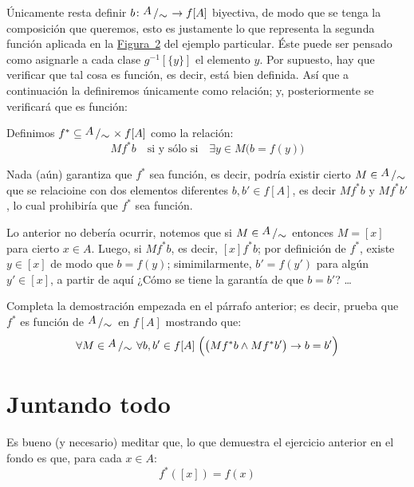 \documentclass[letterpaper,DIV=14,headsepline,12pt]{scrartcl}
\newcommand{\pts}{}
\newenvironment{ejercicio}[1]{\ifthenelse{\equal{#1}{1} \OR
\equal{#1}{+1}}{\renewcommand{\pts}{\textbf{(#1
pt)}}}{\renewcommand{\pts}{\textbf{(#1 pts)}}}\begin{ejj}\upshape
\pts}{\end{ejj}}
\newcommand{\quot}[2]{{\raisebox{.2em}{$#1$}\left/\raisebox{-.2em}{$#2$}\right.}}
\begin{document}
    Únicamente resta definir $b\colon \quot{A}{\sim} \to f[A]$ biyectiva, de modo que
    se tenga la composición que queremos, esto es justamente lo que representa
    la segunda función aplicada en la \hyperref[fig:g]{Figura~2} del ejemplo
    particular. Éste puede ser pensado como asignarle a cada clase
    $g^{-1}[\{y\}]$ el elemento $y$. Por supuesto, hay que verificar que tal
    cosa es función, es decir, está bien definida. Así que a continuación la
    definiremos únicamente como relación; y, posteriormente se verificará que es
    función:
    \begin{definicion}
        Definimos $f^* \subseteq \quot{A}{\sim} \times f[A]$ como la relación:
        \[  M f^* b \quad \text{si y sólo si} \quad \exists y \in M \big( b=f(y)
        \big) \]
    \end{definicion}

    Nada (aún) garantiza que $f^*$ sea función, es decir, podría existir cierto
    $M \in \quot{A}{\sim}$ que se relacioine con dos elementos diferentes $b,b'
    \in f[A]$, es decir $M f^* b$ y $M f^* b'$, lo cual prohibiría que $f^*$ sea
    función.
    
    Lo anterior no debería ocurrir, notemos que si $M \in \quot{A}{\sim}$
    entonces $M=[x]$ para cierto $x \in A$. Luego, si $M f^* b$, es decir, $[x]
    f^* b$; por definición de $f^*$, existe $y \in [x]$ de modo que $b=f(y)$;
    simimilarmente, $b'=f(y')$ para algún $y'\in[x]$, a partir de aquí ¿Cómo se
    tiene la garantía de que $b=b'$? \dots

    \begin{ejercicio}{1.5}\label{ej:fStar} Completa la demostración empezada en
        el párrafo anterior; es decir, prueba que $f^*$ es función de
        $\quot{A}{\sim}$ en $f[A]$ mostrando que:
        \[ \forall M \in \quot{A}{\sim} \; \forall b,b' \in f[A] \; \Big( \big(
        M f^* b \land M f^* b' \big) \to b=b' \Big) \]
    \end{ejercicio}

    \section*{Juntando todo}

    Es bueno (y necesario) meditar que, lo que demuestra el ejercicio anterior
    en el fondo es que, para cada $x \in A$:
    \begin{equation}\label{eq:fStar}
        f^*([x])=f(x)
    \end{equation}
\end{document}
